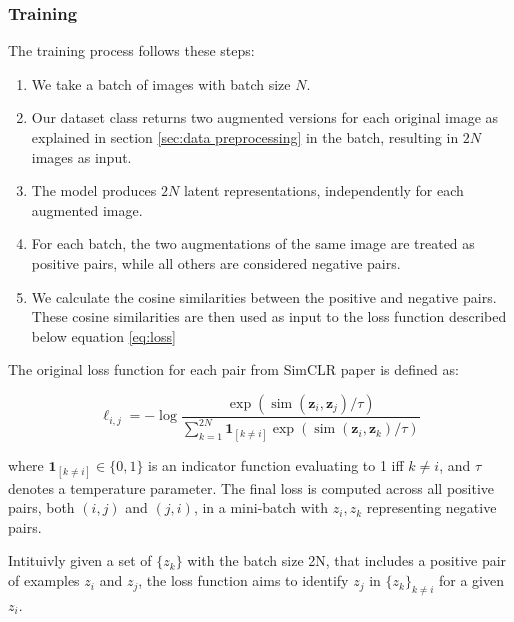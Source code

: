 \subsubsection{Training }
The training process follows these steps:

\begin{enumerate}
    \item We take a batch of images with batch size $N$.
    
    \item Our dataset class returns two augmented versions for each original image as explained in section \ref{sec:data preprocessing} in the batch, 
    resulting in $2N$ images as input.

    \item The model produces $2N$ latent representations, independently for each augmented image.

    \item For each batch, the two augmentations of the same image are treated as positive pairs, while all others are considered negative pairs.

    \item We calculate the cosine similarities between the positive and negative pairs. These cosine similarities are then used as input to the loss
     function described below equation \ref{eq:loss}
\end{enumerate}
The original loss function for each pair from SimCLR paper \cite{chen2020simple} is defined as:

\begin{equation}
\ell_{i, j} = -\log \frac{\exp \left(\operatorname{sim}\left(\boldsymbol{z}_i, \boldsymbol{z}_j\right) / \tau\right)}{\sum_{k=1}^{2 N} \mathbf{1}_{[k \neq i]} \exp \left(\operatorname{sim}\left(\boldsymbol{z}_i, \boldsymbol{z}_k\right) / \tau\right)}
\label{eq:original}
\end{equation}

where \(\mathbf{1}_{[k \neq i]} \in \{0, 1\}\) is an indicator function evaluating to 1 iff \(k \neq i\), and \(\tau\) denotes a temperature parameter.
The final loss is computed across all positive pairs, both \((i, j)\) and \((j, i)\), in a mini-batch with $z_i, z_k$ representing negative pairs.



Intituivly given a set of \( \{ z_k \} \) with the batch size 2N, that includes a positive pair of examples \( z_i \) and \( z_j \), the loss function aims 
to identify \( z_j \) in \( \{ z_k \}_{k \neq i} \) for a given \( z_i \).

